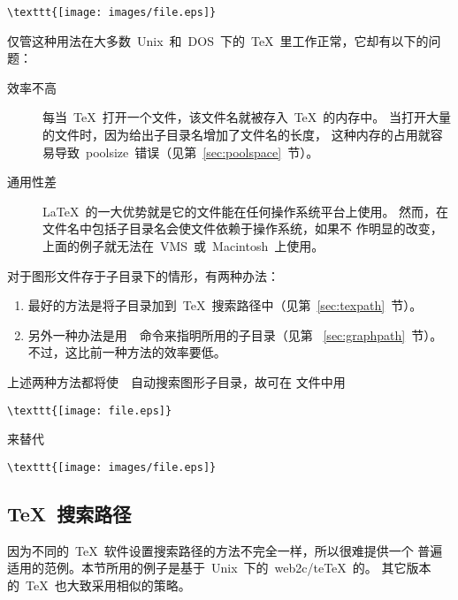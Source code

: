 \begin{Verbatim}
\texttt{[image: images/file.eps]}
\end{Verbatim}
仅管这种用法在大多数~Unix~和~DOS~下的~\TeX{}~里工作正常，它却有以下的问题：
\begin{description}
\item [{ 效率不高}]

      每当~\TeX{}~打开一个文件，该文件名就被存入~TeX{}~的内存中。
      当打开大量的文件时，因为给出子目录名增加了文件名的长度，
      这种内存的占用就容易导致~poolsize~错误（见第~\ref{sec:poolspace}~节）。
\item [{ 通用性差}]

      \LaTeX{}~的一大优势就是它的文件能在任何操作系统平台上使用。
      然而，在文件名中包括子目录名会使文件依赖于操作系统，如果不
      作明显的改变，上面的例子就无法在~VMS~或~Macintosh~上使用。
\end{description}

对于图形文件存于子目录下的情形，有两种办法：
\begin{enumerate}
\item 最好的方法是将子目录加到~\TeX{}~搜索路径中（见第~\ref{sec:texpath}~节）。
\item 另外一种办法是用~~命令来指明所用的子目录（见第
      ~\ref{sec:graphpath}~节）。不过，这比前一种方法的效率要低。
\end{enumerate}

上述两种方法都将使~~自动搜索图形子目录，故可在
文件中用

\begin{Verbatim}
\texttt{[image: file.eps]}
\end{Verbatim}
来替代

\begin{Verbatim}
\texttt{[image: images/file.eps]}
\end{Verbatim}

\subsection{\TeX{}~搜索路径}\label{ssec:texpath}

因为不同的~TeX~软件设置搜索路径的方法不完全一样，所以很难提供一个
普遍适用的范例。本节所用的例子是基于~Unix~下的~web2c/te\TeX{}~的。
其它版本的~\TeX{}~也大致采用相似的策略。

